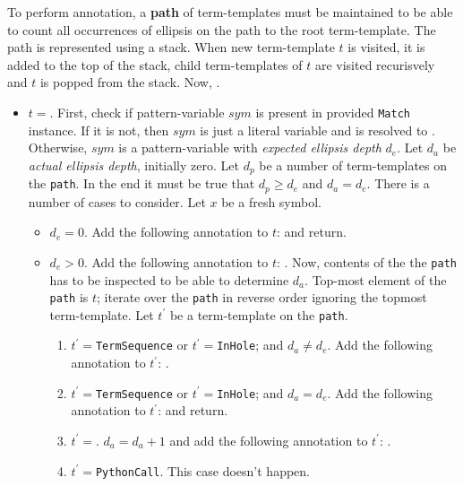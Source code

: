 To perform annotation, a \textbf{path} of term-templates must be maintained to be able to count all occurrences of ellipsis on the path to the root term-template. The path is represented using a stack. When new term-template $t$ is visited, it is added to the top of the stack, child term-templates of $t$ are visited recurisvely and $t$ is popped from the stack. Now, .
\begin{itemize}

\item
$t=$\TermUnresolvedSymbol. First, check if pattern-variable $sym$ is present in provided \texttt{Match} instance. If it is not, then $sym$ is just a literal variable and is resolved to .
Otherwise, $sym$ is a pattern-variable with \textit{expected ellipsis depth} $d_e$. Let $d_a$ be \textit{actual ellipsis depth}, initially zero. Let $d_p$ be a number of \RepeatNoArg term-templates on the \texttt{path}. In the end it must be true that $d_p \geq d_e$ and $d_a = d_e$. There is a number of cases to consider. Let $x$ be a fresh symbol.
	\begin{itemize}
	\item
	$d_e=0$. Add the following annotation to $t$:  and return.
	\item
	$d_e>0$. Add the following annotation to $t$: . Now, contents of the the \texttt{path} has to be inspected to be able to determine $d_a$. Top-most element of the \texttt{path} is $t$; iterate over the \texttt{path} in reverse order ignoring the topmost term-template. Let $t^{\prime}$ be a term-template on the \texttt{path}.
		\begin{enumerate}
		\item
		$t^{\prime}=$\texttt{TermSequence} or $t^{\prime}=$\texttt{InHole}; and $d_a \neq d_e$. Add the following annotation to $t^{\prime}$: . 
		\item
		$t^{\prime}=$\texttt{TermSequence} or $t^{\prime}=$\texttt{InHole}; and $d_a = d_e$.  Add the following annotation to $t^{\prime}$:  and return.
		\item
		$t^{\prime}=$\RepeatNoArg. $d_a = d_a + 1$ and add the following annotation to $t^{\prime}$: .
		\item 
		$t^{\prime}=$\texttt{PythonCall}. This case doesn't happen.
		\end{enumerate}

\end{itemize}
\end{itemize}

